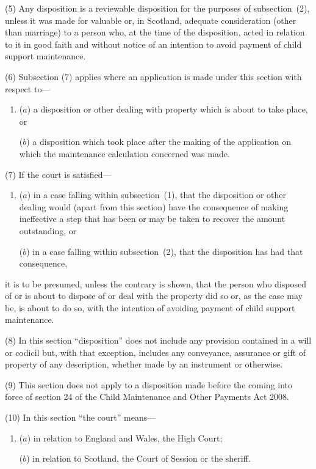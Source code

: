 \documentclass[12pt,a4paper]{article}
\begin{document}
(5)
Any disposition is a reviewable disposition for the purposes of subsection~(2), unless it was made for valuable or, in Scotland, adequate consideration (other than marriage) to a person who, at the time of the disposition, acted in relation to it in good faith and without notice of an intention to avoid payment of child support maintenance.

(6)
Subsection (7) applies where an application is made under this section with respect to---
\begin{enumerate}\item[]
($a$) a disposition or other dealing with property which is about to take place, or

($b$) a disposition which took place after the making of the application on which the maintenance calculation concerned was made.
\end{enumerate}

(7) If the court is satisfied---
\begin{enumerate}\item[]
($a$) in a case falling within subsection~(1), that the disposition or other dealing would (apart from this section) have the consequence of making ineffective a step that has been or may be taken to recover the amount outstanding, or

($b$) in a case falling within subsection~(2), that the disposition has had that consequence,
\end{enumerate}
it is to be presumed, unless the contrary is shown, that the person who disposed of or is about to dispose of or deal with the property did so or, as the case may be, is about to do so, with the intention of avoiding payment of child support maintenance.

(8)
In this section ``disposition'' does not include any provision contained in a will or codicil but, with that exception, includes any conveyance, assurance or gift of property of any description, whether made by an instrument or otherwise.

(9)
This section does not apply to a disposition made before the coming into force of section 24 of the Child Maintenance and Other Payments Act 2008.

(10)
In this section ``the court'' means---
\begin{enumerate}\item[]
($a$) in relation to England and Wales, the High Court;

($b$) in relation to Scotland, the Court of Session or the sheriff.
\end{enumerate}
\end{document}
